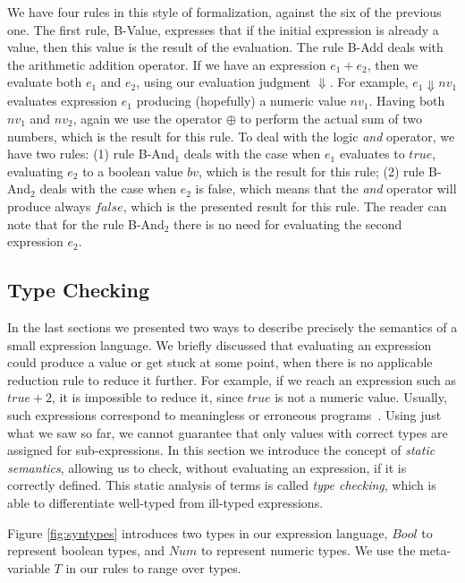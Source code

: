 \documentclass[tese,capa,english]{texufpel}
\begin{document}
We have four rules in this style of formalization, against the six of the previous one. The first rule, {\footnotesize B-Value}, expresses that if the initial expression is already a value, then this value is the result of the evaluation. The rule {\footnotesize B-Add} deals with the arithmetic addition operator. If we have an expression $e_1 + e_2$, then we evaluate both $e_1$ and $e_2$, using our evaluation judgment $\Downarrow$. For example, $e_1 \Downarrow nv_1$ evaluates expression $e_1$ producing (hopefully) a numeric value $nv_1$. Having both $nv_1$ and $nv_2$, again we use the operator $\oplus$ to perform the actual sum of two numbers, which is the result for this rule. To deal with the logic \emph{and} operator, we have two rules: (1) rule {\footnotesize B-And$_1$} deals with the case when $e_1$ evaluates to $true$, evaluating $e_2$ to a boolean value $bv$, which is the result for this rule; (2) rule {\footnotesize B-And$_2$} deals with the case when $e_2$ is false, which means that the \emph{and} operator will produce always $false$, which is the presented result for this rule. The reader can note that for the rule {\footnotesize B-And$_2$} there is no need for evaluating the second expression $e_2$. 

\subsection{Type Checking}

In the last sections we presented two ways to describe precisely the semantics of a small expression language. We briefly discussed that evaluating an expression could produce a value or get stuck at some point, when there is no applicable reduction rule to reduce it further. For example, if we reach an expression such as $true + 2$, it is impossible to reduce it, since $true$ is not a numeric value. Usually, such expressions correspond to meaningless or erroneous programs~\cite{Pierce:2002:TPL:509043}. Using just what we saw so far, we cannot guarantee that only values with correct types are assigned for sub-expressions. In this section we introduce the concept of \emph{static semantics}, allowing us to check, without evaluating an expression, if it is correctly defined. This static analysis of terms is called \emph{type checking}, which is able to differentiate well-typed from ill-typed expressions.

Figure \ref{fig:syntypes} introduces two types in our expression language, $Bool$ to represent boolean types, and $Num$ to represent numeric types. We use the meta-variable $T$ in our rules to range over types.
\end{document}
